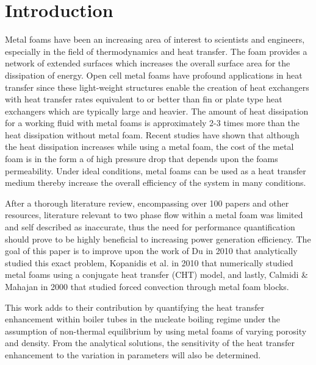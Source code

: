 \documentclass[compileTAMUreport.tex]{subfiles}
\begin{document}
\chapter{Introduction}
Metal foams have been an increasing area of interest to scientists and engineers, especially in the field of thermodynamics and heat transfer. 
The foam provides a network of extended surfaces which increases the overall surface area for the dissipation of energy. 
Open cell metal foams have profound applications in heat transfer since these light-weight structures enable the creation of heat exchangers with heat transfer rates equivalent to or better than fin or plate type heat exchangers which are typically large and heavier.
\cite{Calmidi2000}
The amount of heat dissipation for a working fluid with metal foams is approximately 2-3 times more than the heat dissipation  without metal foam.
\cite{Ken2007}
Recent studies have shown that although the heat dissipation increases while using a metal foam, the cost of the metal foam is in the form a of high pressure drop that depends upon the foams permeability.
\cite{DuPlessis1994,Xianbing2012}
Under ideal conditions, metal foams can be used as a heat transfer medium thereby increase the overall efficiency of the system in many conditions.


After a thorough literature review, encompassing over 100 papers and other resources, literature relevant to two phase flow within a metal foam was limited and self described as inaccurate, thus the need for performance quantification should prove to be highly beneficial to increasing power generation efficiency.
\cite{Zhao2009}
The goal of this paper is to improve upon the work of Du in 2010 that analytically studied this exact problem, Kopanidis et al. in 2010 that numerically studied metal foams using a conjugate heat transfer (CHT) model, and lastly, Calmidi \& Mahajan in 2000 that studied forced convection through metal foam blocks. 
\cite{Du2010,Kopanidis2010,Calmidi2000}

This work adds to their contribution by quantifying the heat transfer enhancement within boiler tubes in the nucleate boiling regime under the assumption of non-thermal equilibrium by using metal foams of varying porosity and density. 
From the analytical solutions, the sensitivity of the heat transfer enhancement to the variation in parameters will also be determined.
\end{document}
